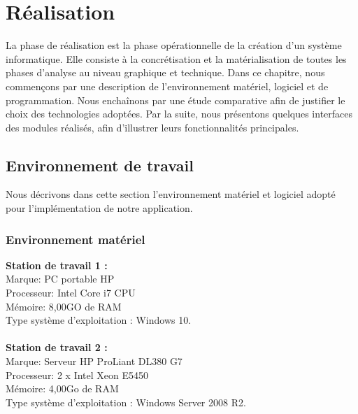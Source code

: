 \chapter{Réalisation}
La phase de réalisation est la phase opérationnelle de la création d’un système informatique.
Elle consiste à la concrétisation et la matérialisation de toutes les phases
d’analyse au niveau graphique et technique.  Dans ce chapitre, nous commençons par
une description de l’environnement matériel, logiciel et de programmation. Nous enchaînons
par une étude comparative afin de justifier le choix des technologies adoptées. Par la suite, 
nous présentons quelques interfaces des modules réalisés, afin d’illustrer leurs fonctionnalités
principales.

\section{Environnement de travail}

Nous décrivons dans cette section l’environnement matériel et logiciel adopté pour l’implémentation de notre application.

\subsection{Environnement matériel}

{\bf Station de travail 1 :}\\
Marque: PC portable HP\\
Processeur: Intel Core i7 CPU\\
Mémoire: 8,00GO de RAM\\
Type système d'exploitation : Windows 10.\\
~\\

{\bf Station de travail 2 :}\\
Marque: Serveur HP ProLiant DL380 G7 \\ 
Processeur: 2 x Intel Xeon E5450\\
Mémoire: 4,00Go de RAM\\
Type système d'exploitation : Windows Server 2008 R2.\\

